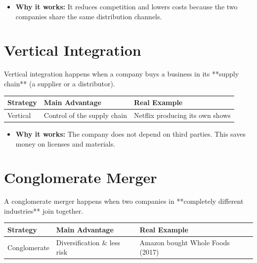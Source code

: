 \documentclass[12pt,a4paper]{report}
\begin{document}
\begin{itemize}
    \item \textbf{Why it works:} It reduces competition and lowers costs because the two companies share the same distribution channels.
\end{itemize}

\section{Vertical Integration}
Vertical integration happens when a company buys a business in its **supply chain** (a supplier or a distributor).

\begin{table}[h]
\centering
\begin{tabular}{lll}
\toprule
\textbf{Strategy} & \textbf{Main Advantage} & \textbf{Real Example} \\
\midrule
Vertical & Control of the supply chain & Netflix producing its own shows \\
\bottomrule
\end{tabular}
\end{table}

\begin{itemize}
    \item \textbf{Why it works:} The company does not depend on third parties. This saves money on licenses and materials.
\end{itemize}

\section{Conglomerate Merger}
A conglomerate merger happens when two companies in **completely different industries** join together.

\begin{table}[h]
\centering
\begin{tabular}{lll}
\toprule
\textbf{Strategy} & \textbf{Main Advantage} & \textbf{Real Example} \\
\midrule
Conglomerate & Diversification \& less risk & Amazon bought Whole Foods (2017) \\
\bottomrule
\end{tabular}
\end{table}
\end{document}
